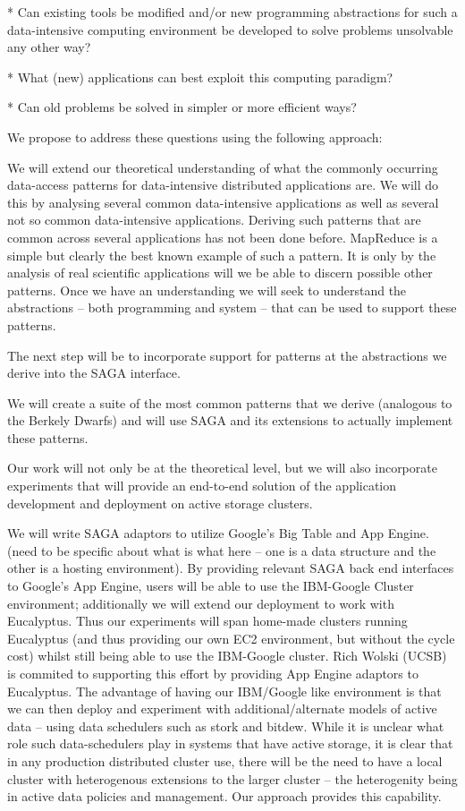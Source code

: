 \documentclass[10pt,letterpaper]{article}
\begin{document}
* Can existing tools be modified and/or new programming abstractions for such a data-intensive computing environment be developed to solve problems unsolvable any other way? 

* What (new) applications can best exploit this computing paradigm?

* Can old problems be solved in simpler or more efficient ways? 

We propose to address these questions  using the following  approach:

We will extend our theoretical understanding of what the commonly occurring 
data-access patterns for data-intensive distributed applications are. We will
do this by analysing several common data-intensive applications as well as
several not so common data-intensive applications. Deriving such patterns
that are common across several applications has not been done before. 
MapReduce is a simple but clearly the best known example of such 
a pattern. It is only by the analysis of real scientific applications will we be able
to discern possible other patterns. 
Once we have an understanding we will seek to understand the abstractions --
both programming and system -- that can be used to support these patterns.

The next step will be to incorporate support for patterns at the abstractions
we derive into the SAGA interface.

We will  create a suite of the most common patterns that we derive 
(analogous to the Berkely Dwarfs) and will use SAGA and its extensions to
actually implement these patterns. 

Our work will not only be at the theoretical level, but we will also
incorporate experiments that will provide an end-to-end solution of
the application development and deployment on active storage clusters.

We will write SAGA adaptors to utilize Google's Big Table and App Engine.
(need to be specific about what is what here -- one is a data structure
and the other is a hosting environment).  By providing relevant
SAGA back end interfaces to Google's App Engine, users will be able
to use the IBM-Google Cluster environment; additionally 
we will extend our deployment to work with Eucalyptus.
Thus our experiments will span home-made clusters running Eucalyptus
(and thus providing our own EC2 environment, but without the
cycle cost) whilst still being able to use the IBM-Google cluster.
Rich Wolski (UCSB) is commited to supporting this effort
by providing App Engine adaptors to Eucalyptus. The advantage
of having our IBM/Google like environment is that we can then 
deploy and experiment with additional/alternate models of active data
-- using data schedulers such as stork and bitdew. While it is unclear
what role such data-schedulers play in systems
that have active storage, it is clear that in any production distributed cluster use, there will be the 
need to have a local cluster with heterogenous extensions to the larger
cluster -- the heterogenity being in active data policies and management.
Our approach provides this capability.
\end{document}

